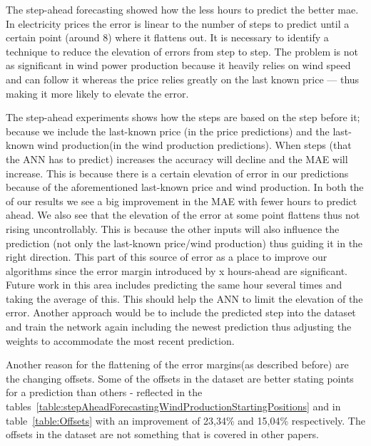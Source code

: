 The step-ahead forecasting showed how the less hours to predict the better mae. In electricity prices the error is linear to the number of steps to predict until a certain point (around 8) where it flattens out. It is necessary to identify a technique to reduce the elevation of errors from step to step. The problem is not as significant in wind power production because it heavily relies on wind speed and can follow it whereas the price relies greatly on the last known price --- thus making it more likely to elevate the error. 

The step-ahead experiments shows how the steps are based on the step before it; because we include the last-known price (in the price predictions) and the last-known wind production(in the wind production predictions). When steps (that the ANN has to predict) increases the accuracy will decline and the MAE will increase. This is because there is a certain elevation of error in our predictions because of the aforementioned last-known price and wind production. In both the of our results we see a big improvement in the MAE with fewer hours to predict ahead. We also see that the elevation of the error at some point flattens thus not rising uncontrollably. This is because the other inputs will also influence the prediction (not only the last-known price/wind production) thus guiding it in the right direction. This part of this source of error as a place to improve our algorithms since the error margin introduced by x hours-ahead are significant. Future work in this area includes predicting the same hour several times and taking the average of this. This should help the ANN to limit the elevation of the error. Another approach would be to include the predicted step into the dataset and train the network again including the newest prediction thus adjusting the weights to accommodate the most recent prediction.

Another reason for the flattening of the error margins(as described before) are the changing offsets. Some of the offsets in the dataset are better stating points for a prediction than others - reflected in the tables~\ref{table:stepAheadForecastingWindProductionStartingPositions} and in table~\ref{table:Offsets} with an improvement of 23,34\% and 15,04\% respectively. The offsets in the dataset are not something that is covered in other papers.
